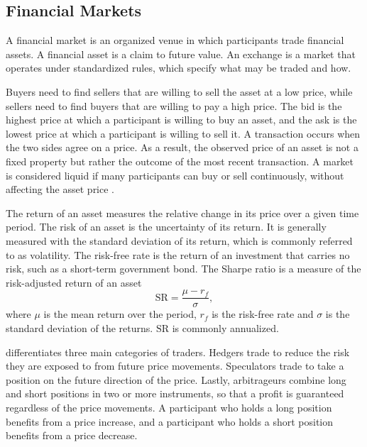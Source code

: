\subsection{Financial Markets}\label{sec:financial-markets}
A financial market is an organized venue in which participants trade financial assets. A financial asset is a claim to future value.  An exchange is a market that operates under standardized rules, which specify what may be traded and how. 

Buyers need to find sellers that are willing to sell the asset at a low price, while sellers need to find buyers that are willing to pay a high price. The bid is the highest price at which a participant is willing to buy an asset, and the ask is the lowest price at which a participant is willing to sell it. A transaction occurs when the two sides agree on a price. As a result, the observed price of an asset is not a fixed property but rather the outcome of the most recent transaction. A market is considered liquid if many participants can buy or sell continuously, without affecting the asset price \parencite[3--7]{harrisTradingExchangesMarket2003}. 

The return of an asset measures the relative change in its price over a given time period. The risk of an asset is the uncertainty of its return. It is generally measured with the standard deviation of its return, which is commonly referred to as volatility. The risk-free rate is the return of an investment that carries no risk, such as a short-term government bond. The Sharpe ratio is a measure of the risk-adjusted return of an asset
\begin{equation}
\mathrm{SR} = \frac{\mu - r_f}{\sigma},
\label{eq:std-sharpe-ratio}
\end{equation}
where $\mu$ is the mean return over the period, $r_f$ is the risk-free rate and $\sigma$ is the standard deviation of the returns. $\mathrm{SR}$ is commonly annualized.

\textcite[33]{hullOptionsFuturesOther2022} differentiates three main categories of traders. Hedgers trade to reduce the risk they are exposed to from future price movements. Speculators trade to take a position on the future direction of the price. Lastly, arbitrageurs combine long and short positions in two or more instruments, so that a profit is guaranteed regardless of the price movements. A participant who holds a long position benefits from a price increase, and a participant who holds a short position benefits from a price decrease.


